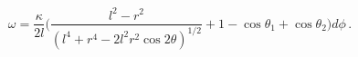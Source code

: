 \begin{equation} \label{omegasol2}
 \omega = \frac{\kappa}{2 l} \biggl(
 \frac{l^2-r^2}{(l^4+r^4-2l^2r^2\cos 2\theta)^{1/2}}
 + 1 - \cos \theta_1 + \cos \theta_2
 \biggr) d\phi \, .
\end{equation}

